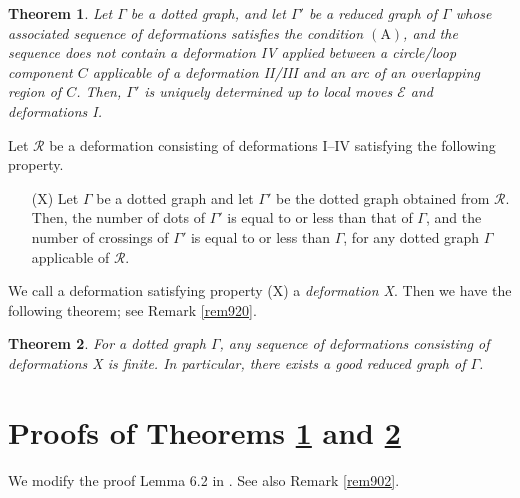 \documentclass[a4paper,11pt]{amsart}
\numberwithin{equation}{section}
\newtheorem{theorem}{Theorem}[section]
\begin{document}
\begin{theorem}\label{prop3-5}
Let $\Gamma$ be a dotted graph, and let $\Gamma'$ be a reduced graph of $\Gamma$ whose associated sequence of deformations  satisfies the condition $\mathrm{(A)}$, and the sequence does not contain a deformation IV applied between a circle/loop component $C$ applicable of a deformation II/III and an arc of an overlapping region of $C$. 
Then, $\Gamma'$ is uniquely determined up to local moves $\mathcal{E}$ and deformations I. 
\end{theorem}


 
 
 

Let $\mathcal{R}$ be a deformation consisting of deformations I--IV satisfying the following property. 
\begin{enumerate}
\item[(X)]
Let $\Gamma$ be a dotted graph and let $\Gamma'$ be the dotted graph obtained from $\mathcal{R}$. Then, the number of dots of $\Gamma'$ is equal to or less than that of $\Gamma$, and the number of crossings of $\Gamma'$ is equal to or less than $\Gamma$, for any dotted graph $\Gamma$ applicable of $\mathcal{R}$. 
\end{enumerate}
We call a deformation satisfying property (X) a {\it deformation X}. Then we have the following theorem; see Remark \ref{rem920}. 

\begin{theorem}\label{r-prop3-5}
For a dotted graph $\Gamma$, any sequence of deformations consisting of deformations X is finite. In particular, there exists a good reduced graph of $\Gamma$.
\end{theorem}


 

\section{Proofs of Theorems \ref{prop3-5} and \ref{r-prop3-5}}\label{sec-proof}

 
We modify the proof Lemma 6.2 in \cite{N}. See also Remark  \ref{rem902}. 
\end{document}
